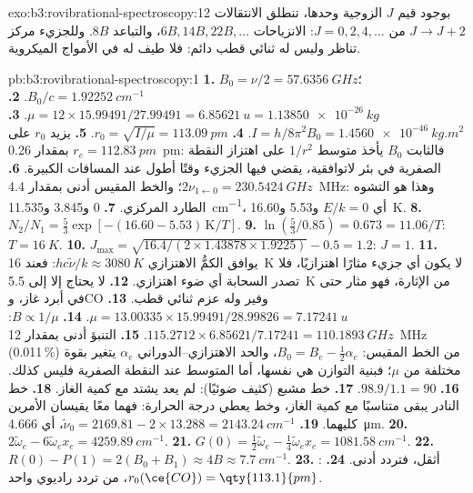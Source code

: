 \begin{solution}{exo:b3:rovibrational-spectroscopy:12}
بوجود قيم $J$ الزوجية وحدها، تنطلق الانتقالات $J \to J + 2$ من $J = 0, 2, 4, \dots$: الانزياحات
$6B, 14B, 22B, \dots$، والتباعد $8B$. وللجزيء  مركز تناظر وليس له
ثنائي قطب دائم: فلا طيف له في الأمواج الميكروية.
\end{solution}

\begin{solution}{pb:b3:rovibrational-spectroscopy:1}
\textbf{1.} $B_0 = \nu/2 = \qty{57.6356}{GHz}$؛ $B_0/c = \qty{1.92252}{cm^{-1}}$.
\textbf{2.} $\mu = 12 \times 15.99491/27.99491 = \qty{6.85621}{u} = \qty{1.13850e-26}{kg}$.
\textbf{3.} $I = h/8\pi^2B_0 = \qty{1.4560e-46}{kg.m^2}$.
\textbf{4.} $r_0 = \sqrt{I/\mu} = \qty{113.09}{pm}$.
\textbf{5.} يزيد $r_0$ على $r_e = \qty{112.83}{pm}$ بمقدار \qty{0.26}{pm}: فالثابت $B_0$ يأخذ متوسط $1/r^2$
على اهتزاز النقطة الصفرية في بئر لاتوافقية، يقضي فيها الجزيء وقتًا أطول
عند المسافات الكبيرة.
\textbf{6.} $2\nu_{1\leftarrow0} = \qty{230.5424}{GHz}$؛ والخط المقيس أدنى بمقدار \qty{4.4}{MHz}:
وهذا هو التشوه الطارد المركزي.
\textbf{7.} $0$ و3.845 و\qty{11.535}{cm^{-1}}، أي $E/k = 0$ و5.53 و\qty{16.60}{K}.
\textbf{8.} $N_2/N_1 = \frac53\exp[-(16.60 - 5.53)\,\mathrm K/T]$.
\textbf{9.} $\ln(\frac53/0.85) = 0.673 = 11.06/T$: $T = \qty{16}{K}$.
\textbf{10.} $J_{\max} = \sqrt{16.4/(2 \times 1.43878 \times 1.9225)} - 0.5 = 1.2$: $J = 1$.
\textbf{11.} يوافق الكمُّ الاهتزازي $hc\tilde\nu/k \approx \qty{3080}{K}$: فعند
\qty{16}{K} لا يكون أي جزيء مثارًا اهتزازيًا، فلا تصدر السحابة أي ضوء
اهتزازي.
\textbf{12.} لا يحتاج إلا إلى \qty{5.5}{K} من الإثارة، فهو مثار حتى في أبرد
غاز، وCO وفير وله عزم ثنائي قطب.
\textbf{13.} $\mu = 13.00335 \times 15.99491/28.99826 = \qty{7.17241}{u}$.
\textbf{14.} $B \propto 1/\mu$: $115.2712 \times 6.85621/7.17241 = \qty{110.1893}{GHz}$.
\textbf{15.} التنبؤ أدنى بمقدار \qty{12}{MHz} (0.011\,\%) من الخط المقيس: $B_0 = B_e - \frac12\alpha_e$، 
والحد الاهتزازي--الدوراني $\alpha_e$ يتغير بقوة مختلفة من $\mu$؛ فبنية
التوازن هي نفسها، أما المتوسط عند النقطة الصفرية فليس كذلك.
\textbf{16.} $98.9/1.1 = 90$.
\textbf{17.} خط  مشبع (كثيف ضوئيًا): لم يعد
يشتد مع كمية الغاز.
\textbf{18.} خط  النادر يبقى متناسبًا مع كمية الغاز، 
وخط  يعطي درجة الحرارة: فهما معًا يقيسان الأمرين كليهما.
\textbf{19.} $\tilde\nu_0 = 2169.81 - 2 \times 13.288 = \qty{2143.24}{cm^{-1}}$، أي \qty{4.666}{\micro m}.
\textbf{20.} $2\tilde\omega_e - 6\tilde\omega_ex_e = \qty{4259.89}{cm^{-1}}$.
\textbf{21.} $G(0) = \frac12\tilde\omega_e - \frac14\tilde\omega_ex_e = \qty{1081.58}{cm^{-1}}$.
\textbf{22.} $R(0) - P(1) = 2(B_0 + B_1) \approx 4B \approx \qty{7.7}{cm^{-1}}$.
\textbf{23.} :  أثقل، فتردد أدنى.
\textbf{24.} \textbf{$r_0(\ce{CO}) = \qty{113.1}{pm}$}، من تردد راديوي واحد.
\end{solution}
